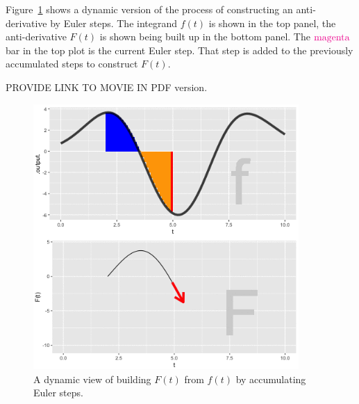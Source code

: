 \documentclass[
  letterpaper,
  DIV=11,
  numbers=noendperiod,
  oneside]{scrreprt}
\begin{document}
Figure~\ref{fig-dynamic-anti-d} shows a dynamic version of the process
of constructing an anti-derivative by Euler steps. The integrand
\(f(t)\) is shown in the top panel, the anti-derivative \(F(t)\) is
shown being built up in the bottom panel. The
\(\color{magenta}{\text{magenta}}\) bar in the top plot is the current
Euler step. That step is added to the previously accumulated steps to
construct \(F(t)\).

PROVIDE LINK TO MOVIE IN PDF version.

\begin{figure}

{\centering \includegraphics[width=0.9\textwidth,height=\textheight]{Accumulation/www/area-plot-still.png}

}

\caption{\label{fig-dynamic-anti-d}A dynamic view of building \(F(t)\)
from \(f(t)\) by accumulating Euler steps.}

\end{figure}
\end{document}
